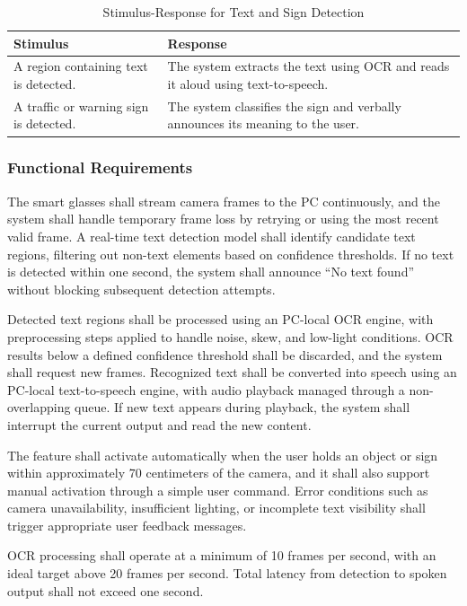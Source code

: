 \begin{table}[H]
    \centering
    \begin{tabular}{|p{}|p{}|}
        \hline
        \textbf{Stimulus} & \textbf{Response} \\
        \hline
        A region containing text is detected. &
        The system extracts the text using OCR and reads it aloud using text-to-speech. \\
        \hline
        A traffic or warning sign is detected. &
        The system classifies the sign and verbally announces its meaning to the user. \\
        \hline
    \end{tabular}
    \caption{Stimulus-Response for Text and Sign Detection}
\end{table}

\subsubsection{Functional Requirements}

The smart glasses shall stream camera frames to the PC continuously, and the system shall handle temporary frame loss by retrying or using the most recent valid frame. A real-time text detection model shall identify candidate text regions, filtering out non-text elements based on confidence thresholds. If no text is detected within one second, the system shall announce “No text found” without blocking subsequent detection attempts.

Detected text regions shall be processed using an PC-local OCR engine, with preprocessing steps applied to handle noise, skew, and low-light conditions. OCR results below a defined confidence threshold shall be discarded, and the system shall request new frames. Recognized text shall be converted into speech using an PC-local text-to-speech engine, with audio playback managed through a non-overlapping queue. If new text appears during playback, the system shall interrupt the current output and read the new content.

The feature shall activate automatically when the user holds an object or sign within approximately 70 centimeters of the camera, and it shall also support manual activation through a simple user command. Error conditions such as camera unavailability, insufficient lighting, or incomplete text visibility shall trigger appropriate user feedback messages.

OCR processing shall operate at a minimum of 10 frames per second, with an ideal target above 20 frames per second. Total latency from detection to spoken output shall not exceed one second.

